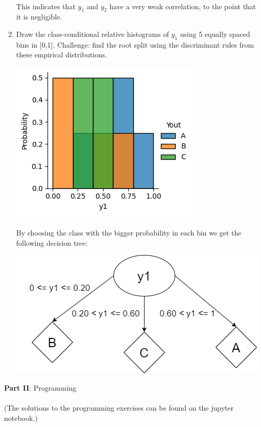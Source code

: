 \documentclass[12pt]{article}
\begin{document}
\begin{enumerate}[leftmargin=\labelsep]
    \paragraph{}This indicates that $y_1$ and $y_2$ have a very weak correlation, to the point that it is negligible.

    \item Draw the class-conditional relative histograms of $y_1$ using 5 equally spaced bins in [0,1].
    Challenge: find the root split using the discriminant rules from these empirical distributions.    

    \begin{center}
        \includegraphics[scale=1]{images/histogram.png}
    \end{center}

    \paragraph{} By choosing the class with the bigger probability in each bin we get the following decision tree:

    \begin{center}
        \includegraphics[scale=0.5]{images/small-decision-tree.png}
    \end{center}

\end{enumerate}

\vskip 1cm

\large{\textbf{Part II}: Programming}\normalsize

\paragraph{}(The solutions to the programming exercises can be found on the jupyter notebook.)
\end{document}
